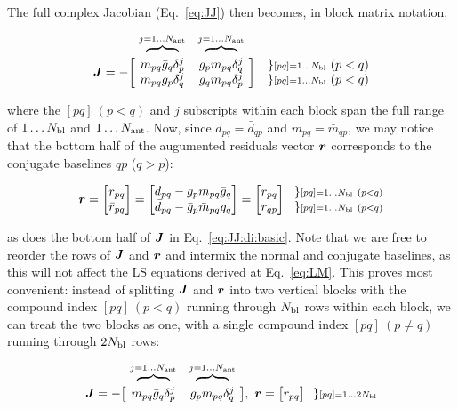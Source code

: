 \documentclass[useAMS,usenatbib]{mn2e}
\newcommand{\mat}[1]{{\bmath{#1}}}
\newcommand{\JJ}{\mat{J}} %
\begin{document}
The full complex Jacobian (Eq.~\ref{eq:JJ}) then becomes, in block matrix notation,

\begin{equation}
\label{eq:JJ:di:basic}
\begin{array}{r@{~}cc@{~}cc}
                & \overbrace{~~~~~~~~}^{j=1\dots \Na} & \overbrace{~~~~~~~~}^{j=1\dots \Na} \\
\JJ = - \bigg [ &
  \Stack{ m_{pq}\bar{g}_q\delta^{j}_p \\ \bar{m}_{pq} \bar{g}_p \delta^{j}_q } &
  \Stack{ g_p m_{pq} \delta^{j}_q \\ g_q \bar{m}_{pq} \delta^{j}_p }  
& \bigg ] &
\Stack{ \} {\scriptstyle [pq]=1\dots \Nbl}~(p<q) \\ \} {\scriptstyle [pq]=1\dots \Nbl}~(p<q) }

\end{array}
\end{equation}

where the $[pq]~(p<q)$ and $j$ subscripts within each block span the full range of $1\dots N_\mathrm{bl}$ and $1\dots N_\mathrm{ant}$. Now, 
since $d_{pq} = \bar{d}_{qp}$ and $m_{pq} = \bar{m}_{qp}$, we may notice
that the bottom half of the augumented residuals vector $\bmath{r}$ corresponds to the conjugate baselines 
$qp$ ($q>p$):


\[
\bmath{r} = \Matrix{c}{ r_{pq} \\ \bar{r}_{pq} } = \Matrix{c}{d_{pq}-g_p m_{pq}\bar{g}_q\\ \bar{d}_{pq}-\bar{g}_p \bar{m}_{pq}g_q} = 
\Matrix{c}{ r_{pq} \\ r_{qp} }~~ 
\Stack{ \} \scriptstyle [pq]=1\dots \Nbl~(p<q) \\ \} \scriptstyle [pq]=1\dots \Nbl~(p<q) }
\]

as does the bottom half of $\JJ$ in Eq.~\ref{eq:JJ:di:basic}. Note that we are free to reorder the rows of $\JJ$ and $\bmath{r}$ 
and intermix the normal and conjugate baselines, as this will not affect the LS equations derived at Eq.~\ref{eq:LM}.
This proves most convenient: instead of splitting $\JJ$ and $\bmath{r}$ into 
two vertical blocks with the compound index $[pq]~(p<q)$ running through $N_\mathrm{bl}$ rows within each block, we can treat 
the two blocks as one, with a single compound index $[pq]~(p\ne q)$ running through $2N_\mathrm{bl}$ rows:

\begin{equation}
\label{eq:JJ:di}
\begin{array}{r@{~}cc@{~}cc}
                & \overbrace{~~~~~~~~}^{j=1\dots \Na} & \overbrace{~~~~~~~~}^{j=1\dots \Na} \\
\JJ = - \big [ & m_{pq}\bar{g}_q\delta^{j}_p & g_p m_{pq} \delta^{j}_q & \big ],~
\bmath{r} = \big [ r_{pq} \big ] ~~{\} \scriptstyle [pq]=1\dots 2\Nbl}
\end{array}
\end{equation}
\end{document}
